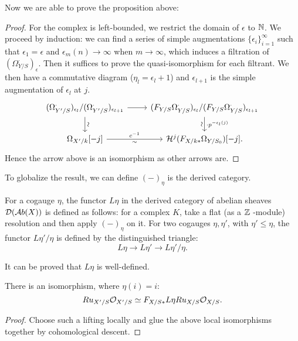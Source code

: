 Now we are able to prove the proposition above:
\begin{proof}
    For the complex is left-bounded, 
    we restrict the domain of $\epsilon$ to ${\mathbb {N}}$. 
    We proceed by induction: 
    we can find a series of simple augmentations $\{\epsilon_i\}_{i=1}^{\infty}$ 
    such that $\epsilon_1=\epsilon$ and $\epsilon_m(n)\to \infty$ when $m\to \infty$, 
    which induces a filtration of $(\Omega_{Y/S}^\cdot)_\epsilon$. 
    Then it suffices to prove the quasi-isomorphism for each filtrant. 
    We then have a commutative diagram ($\eta_l=\epsilon_l+1$) 
    and $\epsilon_{l+1}$ is the simple augmentation of $\epsilon_l$ at $j$.
    \[
        \begin{tikzcd}
            (\Omega_{Y'/S}^\cdot)_{\epsilon_l} / (\Omega_{Y'/S}^\cdot)_{\epsilon_{l + 1}} 
            \ar[r] \ar[d, "\sim"sloped]
            & (F_{Y/S} \Omega_{Y/S}^\cdot)_{\epsilon_l} / 
            (F_{Y/S} \Omega_{Y/S}^\cdot)_{\epsilon_{l+1}} 
            \dar[] {\cdot p^{-\epsilon_l(j)}}[sloped, swap] {\sim} \\
            \Omega_{X'/k}[-j] \ar[r, "c^{-1}", "\sim"swap] & 
            \CH^j (F_{X/k*} \Omega_{Y/S_0}) [-j].
        \end{tikzcd}
    \]
Hence the arrow above is an isomorphism as other arrows are.
\end{proof}

To globalize the result, we can define $(-)_\eta$ is the derived category.
\begin{definition}
    For a cogauge $\eta$, the functor $L \eta$ 
    in the derived category of abelian sheaves ${\mathcal {D}}({\mathcal {A}} b(X))$ 
    is defined as follows: for a complex $K$, 
    take a flat (as a ${\mathbb {Z}}$ -module) resolution and then 
    apply $(-)_\eta$ on it. 
    For two cogauges $\eta, \eta'$, with $\eta' \leq \eta$, 
    the functor $L\eta'/\eta$ is defined by the distinguished triangle:
    \[
        L\eta \to L \eta' \to L \eta'/\eta.
    \]
\end{definition}

It can be proved that $L\eta$ is well-defined.
\begin{theorem}
    There is an isomorphism, where $\eta(i)=i$:
    \[
        Ru_{X'/S} {\mathcal {O}}_{X'/S} \simeq F_{X/S*}L \eta Ru_{X/S} {\mathcal {O}}_{X/S}.
    \]
\end{theorem}

\begin{proof}
    Choose such a lifting locally and 
    glue the above local isomorphisms together by cohomological descent. 
\end{proof}

